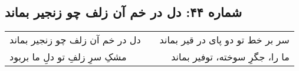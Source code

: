 \begin{center}
\section*{شماره ۴۴: دل در خم آن زلف چو زنجیر بماند}
\label{sec:044}
\begin{longtable}{l p{0.5cm} r}
دل در خم آن زلف چو زنجیر بماند
&&
سر بر خط تو دو پای در قیر بماند
\\
مشکِ سرِ زلفِ تو دلِ ما بربود
&&
ما را، جگرِ سوخته، توفیر بماند
\\
\end{longtable}
\end{center}
